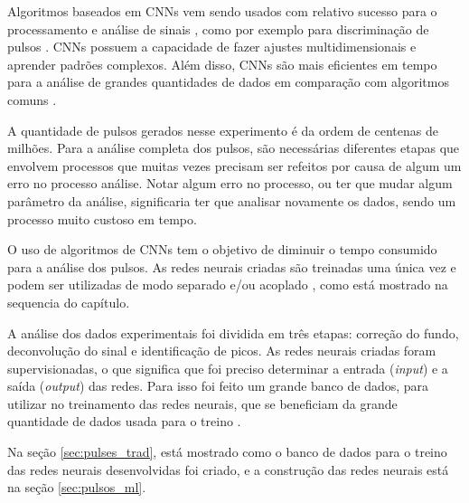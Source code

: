 \documentclass[a4paper,12pt,oneside]{book}
\begin{document}
\par Algoritmos baseados em CNNs vem sendo usados com relativo sucesso para o processamento e análise de sinais \cite{FORTINO2022166497}, como por exemplo para discriminação de pulsos \cite{Holl2019}. CNNs possuem a capacidade de fazer ajustes multidimensionais e aprender padrões complexos. Além disso, CNNs são mais eficientes em tempo para a análise de grandes quantidades de dados em comparação com algoritmos comuns \cite{FORTINO2022166497}.

\par A quantidade de pulsos gerados nesse experimento é da ordem de centenas de milhões. Para a análise completa dos pulsos, são necessárias diferentes etapas que envolvem processos que muitas vezes precisam ser refeitos por causa de algum um erro no processo análise. Notar algum erro no processo, ou ter que mudar algum parâmetro da análise, significaria ter que analisar novamente os dados, sendo um processo muito custoso em tempo.

\par O uso de algoritmos de CNNs tem o objetivo de diminuir o tempo consumido para a análise dos pulsos. As redes neurais criadas são treinadas uma única vez e podem ser utilizadas de modo separado e/ou acoplado \cite{FORTINO2022166497}, como está mostrado na sequencia do capítulo.

\par A análise dos dados experimentais foi dividida em três etapas: correção do fundo, deconvolução do sinal e identificação de picos. As redes neurais criadas foram supervisionadas, o que significa que foi preciso determinar a entrada (\textit{input}) e a saída (\textit{output}) das redes. Para isso foi feito um grande banco de dados, para utilizar no treinamento das redes neurais, que se beneficiam da grande quantidade de dados usada para o treino \cite{mlbook}.

\par Na seção \ref{sec:pulses_trad}, está mostrado como o banco de dados para o treino das redes neurais desenvolvidas foi criado, e a construção das redes neurais está na seção \ref{sec:pulsos_ml}.




\end{document}
